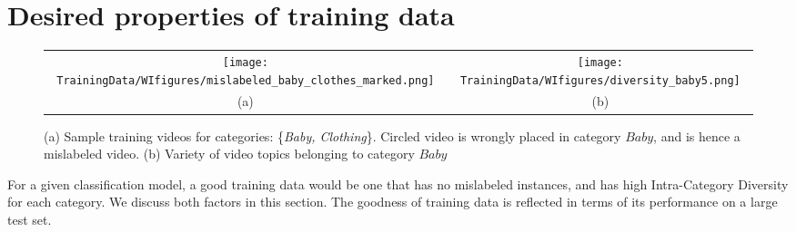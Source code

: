 \section{Desired properties of training data}
\label{sec:desiredpropdata}
\begin{figure*}[!htb]
\centering
\begin{tabular}{cc}
\texttt{[image: TrainingData/WIfigures/mislabeled\_baby\_clothes\_marked.png]}
&
\texttt{[image: TrainingData/WIfigures/diversity\_baby5.png]} \\ 
(a) & (b) \\ 
\end{tabular}
\caption{ \small{ (a) Sample training videos for categories: \{\textit{Baby, Clothing}\}. Circled video is wrongly placed in category $Baby$, and is hence a mislabeled video. (b) Variety of video topics belonging to category $Baby$  }}
\label{fig:trainingdatapropsfigs}
\end{figure*} 
For a given classification model, a good training data would be one that has no mislabeled instances, and has high Intra-Category Diversity for each category. We discuss both factors in this section. The goodness of training data is reflected in terms of its performance on a large test set. 

